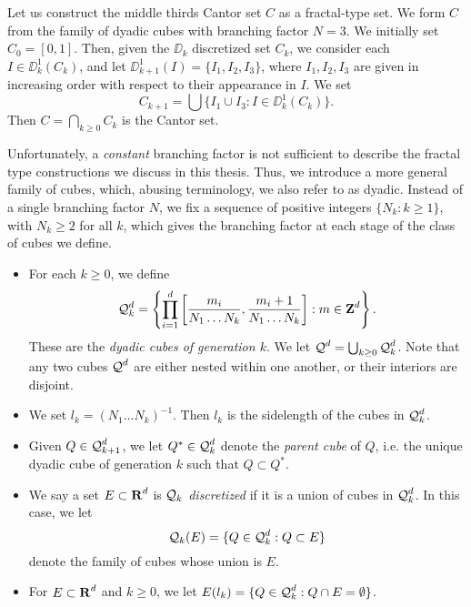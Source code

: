 \begin{example}
	Let us construct the middle thirds Cantor set $C$ as a fractal-type set. We form $C$ from the family of dyadic cubes with branching factor $N = 3$. We initially set $C_0 = [0,1]$. Then, given the $\DD_k$ discretized set $C_k$, we consider each $I \in \DD_k^1(C_k)$, and let $\DD_{k+1}^1(I) = \{ I_1, I_2, I_3 \}$, where $I_1, I_2, I_3$ are given in increasing order with respect to their appearance in $I$. We set
	\[ C_{k+1} = \bigcup \{ I_1 \cup I_3 : I \in \DD_k^1(C_k) \}. \]
	Then $C = \bigcap_{k \geq 0} C_k$ is the Cantor set.
\end{example}

Unfortunately, a \emph{constant} branching factor is not sufficient to describe the fractal type constructions we discuss in this thesis. Thus, we introduce a more general family of cubes, which, abusing terminology, we also refer to as dyadic. Instead of a single branching factor $N$, we fix a sequence of positive integers $\{ N_k : k \geq 1 \}$, with $N_k \geq 2$ for all $k$, which gives the branching factor at each stage of the class of cubes we define.
%
\begin{itemize}
	\item For each $k \geq 0$, we define 
	\[ \operatorname{\mathcal{Q}}_k^d = \left\{ \prod_{i = 1}^d \left[ \frac{m_i}{N_1 \dots N_k}, \frac{m_i + 1}{N_1 \dots N_k} \right] : m \in \operatorname{\mathbf{Z}}^d \right\}. \]
	These are the \emph{dyadic cubes of generation $k$}. We let $\operatorname{\mathcal{Q}}^d = \bigcup_{k \geq 0} \operatorname{\mathcal{Q}}_k^d$. Note that any two cubes $\operatorname{\mathcal{Q}}^d$ are either nested within one another, or their interiors are disjoint.

	\item We set $l_k = (N_1 \dots N_k)^{-1}$. Then $l_k$ is the sidelength of the cubes in $\operatorname{\mathcal{Q}}_k^d$.

	\item Given $Q \in \operatorname{\mathcal{Q}}_{k+1}^d$, we let $Q^* \in \operatorname{\mathcal{Q}}_k^d$ denote the \emph{parent cube} of $Q$, i.e. the unique dyadic cube of generation $k$ such that $Q \subset Q^*$.

	\item We say a set $E \subset \operatorname{\mathbf{R}}^d$ is \emph{$\operatorname{\mathcal{Q}}_k$ discretized} if it is a union of cubes in $\operatorname{\mathcal{Q}}_k^d$. In this case, we let
	\[ \operatorname{\mathcal{Q}}_k(E) = \{ Q \in \operatorname{\mathcal{Q}}_k^d: Q \subset E \} \]
	denote the family of cubes whose union is $E$.

	\item For $E \subset \operatorname{\mathbf{R}}^d$ and $k \geq 0$, we let $E(l_k) = \{ Q \in \operatorname{\mathcal{Q}}_k^d : Q \cap E = \emptyset \}$.
\end{itemize}

